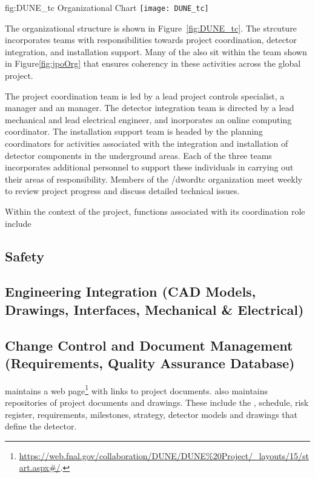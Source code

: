 \begin{dunefigure}{fig:DUNE_tc}
  {  Organizational Chart}
  \texttt{[image: DUNE\_tc]}
\end{dunefigure}

The   organizational structure is shown in 
Figure~\ref{fig:DUNE_tc}.  The strcuture incorporates teams with 
responsibilities towards project coordination, detector integration,
and installation support.  Many of the  also sit within 
the  team shown in Figure\ref{fig:jpoOrg} that ensures 
coherency in these activities across the global project.

The project coordination team is led by a lead project controls
specialist, a  manager and an  manager.  The
detector integration team is directed by a lead mechanical and lead
electrical engineer, and inorporates an online computing coordinator.
The installation support team is headed by the planning coordinators 
for activities associated with the integration and installation of 
detector components in the underground areas.  Each of the three 
teams incorporates additional personnel to support these individuals 
in carrying out their areas of responsibility.  Members of the 
/dword{tc} organization meet weekly to review project progress and 
discuss detailed technical issues. 
     
Within the context of the  project,  functions 
associated with its coordination role include

\subsection{Safety}

\subsection{Engineering Integration (CAD Models, Drawings, Interfaces, Mechanical \& Electrical)}

\subsection{Change Control and Document Management (Requirements, Quality Assurance Database)}

 maintains a web
page\footnote{\url{https://web.fnal.gov/collaboration/DUNE/DUNE\%20Project/\_layouts/15/start.aspx\#/}.}
with links to project documents.  also maintains repositories of project documents and drawings.
These include the , schedule, risk register, requirements, milestones, strategy, detector 
models and drawings that define the  detector.

